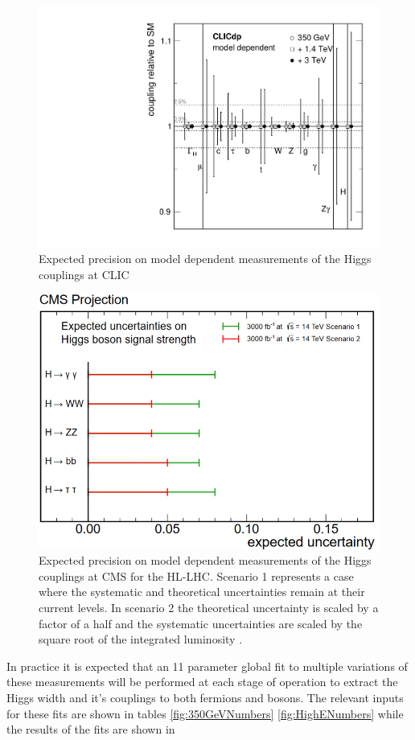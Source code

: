 \begin{figure}
\centering
\includegraphics[width=0.35\linewidth]{Theory/fig/modeldependent2.png}
\caption[Expected precision on model dependent measurements of the Higgs couplings at CLIC]{Expected precision on model dependent measurements of the Higgs couplings at CLIC}
\label{fig:modelDependentCouplings}
\end{figure}

\begin{figure}
\centering
\includegraphics[width=0.5\linewidth]{Theory/fig/CMSHiggsPredictions}
\caption[Expected precision on model dependent measurements of the Higgs couplings at CMS]{Expected precision on model dependent measurements of the Higgs couplings at \ac{CMS} for the \ac{HL-LHC}. Scenario 1 represents a case where the systematic and theoretical uncertainties remain at their current levels. In scenario 2 the theoretical uncertainty is scaled by a factor of a half and the systematic uncertainties are scaled by the square root of the integrated luminosity \cite{CMS:2013xfa}.}
\label{fig:CMSHiggsPredictions}
\end{figure}

In practice it is expected that an 11 parameter global fit to multiple variations of these measurements will be performed at each stage of operation to extract the Higgs width and it's couplings to both fermions and bosons. The relevant inputs for these fits are shown in tables \ref{fig:350GeVNumbers} \ref{fig:HighENumbers} while the results of the fits are shown in 

